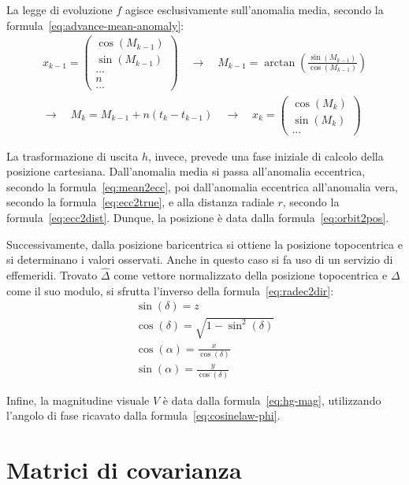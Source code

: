 \documentclass[12pt,a4paper,openright,twoside]{book}
\begin{document}
La legge di evoluzione $f$ agisce esclusivamente sull'anomalia media, secondo la formula~\ref{eq:advance-mean-anomaly}:
\begin{gather*}
x_{k-1}=\begin{pmatrix}
\cos(M_{k-1}) \\
\sin(M_{k-1}) \\
... \\
n \\
...
\end{pmatrix}
\quad\rightarrow\quad
M_{k-1}=\arctan\left(\frac{\sin(M_{k-1})}{\cos(M_{k-1})}\right) \\
\rightarrow\quad
M_k=M_{k-1}+n(t_k-t_{k-1})
\quad\rightarrow\quad
x_k=\begin{pmatrix}
\cos(M_k) \\
\sin(M_k) \\
...
\end{pmatrix}
\end{gather*}

La trasformazione di uscita $h$, invece, prevede una fase iniziale di calcolo della posizione cartesiana. Dall'anomalia media si passa all'anomalia eccentrica, secondo la formula~\ref{eq:mean2ecc}, poi dall'anomalia eccentrica all'anomalia vera, secondo la formula~\ref{eq:ecc2true}, e alla distanza radiale $r$, secondo la formula~\ref{eq:ecc2dist}. Dunque, la posizione è data dalla formula~\ref{eq:orbit2pos}.

Successivamente, dalla posizione baricentrica si ottiene la posizione topocentrica e si determinano i valori osservati. Anche in questo caso si fa uso di un servizio di effemeridi. Trovato $\hat{\Delta}$ come vettore normalizzato della posizione topocentrica e $\Delta$ come il suo modulo, si sfrutta l'inverso della formula~\ref{eq:radec2dir}:
\begin{gather}
\sin(\delta)=z \\
\cos(\delta)=\sqrt{1-\sin^2(\delta)} \\
\cos(\alpha)=\frac{x}{\cos(\delta)} \\
\sin(\alpha)=\frac{y}{\cos(\delta)}
\end{gather}

Infine, la magnitudine visuale $V$ è data dalla formula~\ref{eq:hg-mag}, utilizzando l'angolo di fase ricavato dalla formula~\ref{eq:cosinelaw-phi}.

\section{Matrici di covarianza}\label{sec:real-system-covs}
\end{document}
